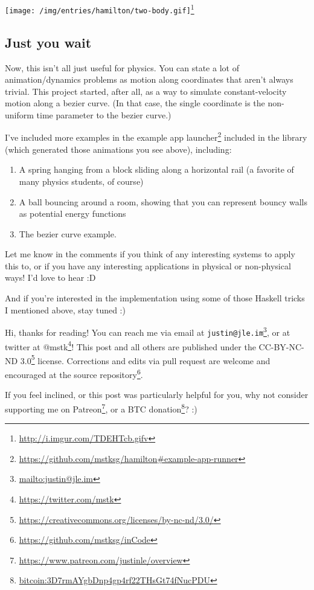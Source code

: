 \documentclass[]{article}
\renewcommand{\href}[2]{#2\footnote{\url{#1}}}
\begin{document}
\href{http://i.imgur.com/TDEHTcb.gifv}{\texttt{[image: /img/entries/hamilton/two-body.gif]}}

\hypertarget{just-you-wait}{%
\subsection{Just you wait}\label{just-you-wait}}

Now, this isn't all just useful for physics. You can state a lot of
animation/dynamics problems as motion along coordinates that aren't always
trivial. This project started, after all, as a way to simulate constant-velocity
motion along a bezier curve. (In that case, the single coordinate is the
non-uniform time parameter to the bezier curve.)

I've included more examples in the
\href{https://github.com/mstksg/hamilton\#example-app-runner}{example app
launcher} included in the library (which generated those animations you see
above), including:

\begin{enumerate}
\def\labelenumi{\arabic{enumi}.}
\tightlist
\item
  A spring hanging from a block sliding along a horizontal rail (a favorite of
  many physics students, of course)
\item
  A ball bouncing around a room, showing that you can represent bouncy walls as
  potential energy functions
\item
  The bezier curve example.
\end{enumerate}

Let me know in the comments if you think of any interesting systems to apply
this to, or if you have any interesting applications in physical or non-physical
ways! I'd love to hear :D

And if you're interested in the implementation using some of those Haskell
tricks I mentioned above, stay tuned :)

Hi, thanks for reading! You can reach me via email at
\href{mailto:justin@jle.im}{\nolinkurl{justin@jle.im}}, or at twitter at
\href{https://twitter.com/mstk}{@mstk}! This post and all others are published
under the \href{https://creativecommons.org/licenses/by-nc-nd/3.0/}{CC-BY-NC-ND
3.0} license. Corrections and edits via pull request are welcome and encouraged
at \href{https://github.com/mstksg/inCode}{the source repository}.

If you feel inclined, or this post was particularly helpful for you, why not
consider \href{https://www.patreon.com/justinle/overview}{supporting me on
Patreon}, or a \href{bitcoin:3D7rmAYgbDnp4gp4rf22THsGt74fNucPDU}{BTC donation}?
:)
\end{document}
